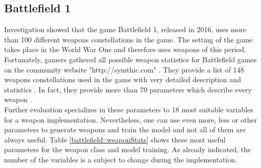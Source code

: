\documentclass[MGS,Master,english]{twbook}%
\begin{document}
\subsection{Battlefield 1}
Investigation showed that the game Battlefield 1, released in 2016, uses more than 100 different weapons constellations in the game. The setting of the game takes place in the World War One and therefore uses weapons of this period. Fortunately, gamers gathered all possible weapon statistics for Battlefield games on the community website "http://symthic.com" \cite{symthic::bf1stats}. They provide a list of 148 weapons constellations used in the game with very detailed description and statistics \cite{symthic::bf1stats}. In fact, they provide more than 70 parameters which describe every weapon \cite{symthic::bf1stats}. \\
Further evaluation specializes in these parameters to 18 most suitable variables for a weapon implementation. Nevertheless, one can use even more, less or other parameters to generate weapons and train the model and not all of them are always useful. Table \ref{battlefield::weaponStats} shows these most useful parameters for the weapon class and model training. As already indicated, the number of the variables is a subject to change during the implementation.
\end{document}
